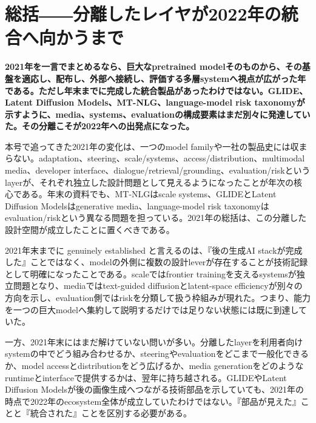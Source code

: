 \section{総括――分離したレイヤが2022年の統合へ向かうまで}
\label{pkg:synthesis-transition-2022}
\noindent\textbf{2021年を一言でまとめるなら、巨大なpretrained modelそのものから、その基盤を適応し、配布し、外部へ接続し、評価する多層systemへ視点が広がった年である。ただし年末までに完成した統合製品があったわけではない。GLIDE、Latent Diffusion Models、MT-NLG、language-model risk taxonomyが示すように、media、systems、evaluationの構成要素はまだ別々に発達していた。その分離こそが2022年への出発点になった。}\autocite{src-20fd9bba2e7a,src-50244427230b,src-a4561c635fe6,src-b307b4b82867}

本号で追ってきた2021年の変化は、一つのmodel familyや一社の製品史には収まらない。adaptation、steering、scale/systems、access/distribution、multimodal media、developer interface、dialogue/retrieval/grounding、evaluation/riskというlayerが、それぞれ独立した設計問題として見えるようになったことが年次の核心である。年末の資料でも、MT-NLGはscale systems、GLIDEとLatent Diffusion Modelsはgenerative media、language-model risk taxonomyはevaluation/riskという異なる問題を担っている。2021年の総括は、この分離した設計空間が成立したことに置くべきである。\autocite{src-20fd9bba2e7a,src-50244427230b,src-a4561c635fe6,src-b307b4b82867}


2021年末までに genuinely established と言えるのは、『後の生成AI stackが完成した』ことではなく、modelの外側に複数の設計leverが存在することが技術記録として明確になったことである。scaleではfrontier trainingを支えるsystemsが独立問題となり、mediaではtext-guided diffusionとlatent-space efficiencyが別々の方向を示し、evaluation側ではriskを分類して扱う枠組みが現れた。つまり、能力を一つの巨大modelへ集約して説明するだけでは足りない状態には既に到達していた。\autocite{src-20fd9bba2e7a,src-50244427230b,src-a4561c635fe6,src-b307b4b82867}


一方、2021年末にはまだ解けていない問いが多い。分離したlayerを利用者向けsystemの中でどう組み合わせるか、steeringやevaluationをどこまで一般化できるか、model accessとdistributionをどう広げるか、media generationをどのようなruntimeとinterfaceで提供するかは、翌年に持ち越される。GLIDEやLatent Diffusion Modelsが後の画像生成へつながる技術部品を示していても、2021年の時点で2022年のecosystem全体が成立していたわけではない。『部品が見えた』ことと『統合された』ことを区別する必要がある。\autocite{src-50244427230b,src-a4561c635fe6}


